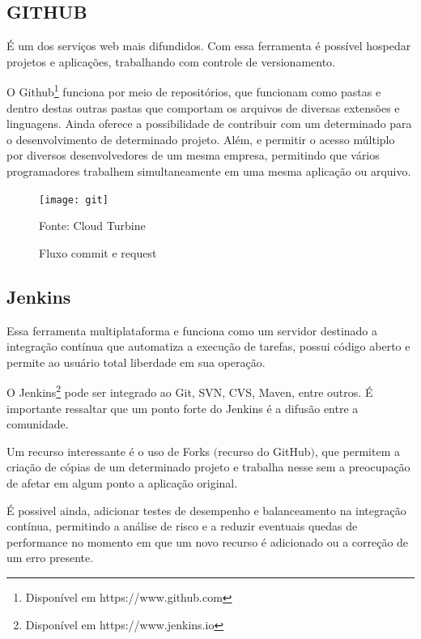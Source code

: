 \subsection{GITHUB}
É um dos serviços web mais difundidos. Com essa ferramenta é possível hospedar projetos e aplicações, trabalhando com controle de versionamento.

O Github\footnote{Disponível em https://www.github.com} funciona por meio de repositórios, que funcionam como pastas e dentro destas outras pastas que comportam os arquivos de diversas extensões e linguagens. Ainda oferece a possibilidade de contribuir com um determinado para o desenvolvimento de determinado projeto. Além, e permitir o acesso múltiplo por diversos desenvolvedores de um mesma empresa, permitindo que vários programadores trabalhem simultaneamente em uma mesma aplicação ou arquivo.

\begin{figure} [htb]
	\centering
	\texttt{[image: git]}
	\caption{Fluxo commit e request}
	Fonte: Cloud Turbine
	\label{fig:git}
\end{figure}

\subsection{Jenkins}
Essa ferramenta multiplataforma e funciona como um servidor destinado a integração contínua que automatiza a execução de tarefas, possui código aberto e permite ao usuário total liberdade em sua operação.

O Jenkins\footnote{Disponível em https://www.jenkins.io} pode ser integrado ao Git, SVN, CVS, Maven, entre outros. É importante ressaltar que um ponto forte do Jenkins é a difusão entre a comunidade.

Um recurso interessante é o uso de Forks $($recurso do GitHub$)$, que permitem a criação de cópias de um determinado projeto e trabalha nesse sem a preocupação de afetar em algum ponto a aplicação original.

É possivel ainda, adicionar testes de desempenho e balanceamento na integração contínua, permitindo a análise de risco e a reduzir eventuais quedas de performance no momento em que um novo recurso é adicionado ou a correção de um erro presente.





